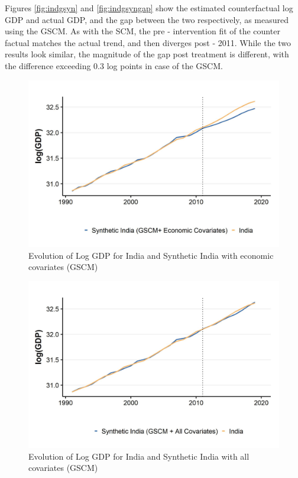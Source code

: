 \documentclass[12pt,nobind, a4paper]{reedthesis}
\begin{document}
 Figures \ref{fig:indgsyn} and \ref{fig:indgsyngap} show the estimated counterfactual log GDP and actual GDP, and the gap between the two respectively, as measured using the GSCM. As with the SCM, the pre - intervention fit of the counter factual matches the actual trend, and then diverges post - 2011. While the two results look similar, the magnitude of the gap post treatment is different, with the difference exceeding 0.3 log points in case of the GSCM.
 \newpage
 \begin{figure}

 {\centering \includegraphics[width=1\linewidth]{figure/indiagsynthc2} 

 }

 \caption{Evolution of Log GDP for India and Synthetic India with economic covariates (GSCM)}\label{fig:indgsync1}
 \end{figure}
 \begin{figure}

 {\centering \includegraphics[width=1\linewidth]{figure/indiagsynthc1} 

 }

 \caption{Evolution of Log GDP for India and Synthetic India with all covariates (GSCM)}\label{fig:indgsync2}
 \end{figure}
\end{document}
